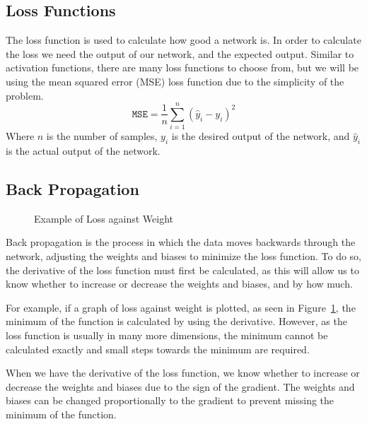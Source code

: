 \documentclass[a1,portrait]{a1poster}
\begin{document}
\begin{multicols}{2}
\subsection*{Loss Functions}
The loss function is used to calculate how good a network is. In order to calculate the loss we need the output of our network, and the expected output. Similar to activation functions, there are many loss functions to choose from, but we will be using the mean squared error (MSE) loss function due to the simplicity of the problem.
\begin{equation}
    \texttt{MSE} = \frac{1}{n}\sum_{i=1}^{n}(\hat{y}_i - y_i)^2
    \label{eq:mse}
\end{equation}
Where $n$ is the number of samples, $y_i$ is the desired output of the network, and $\hat{y}_i$ is the actual output of the network.
\subsection*{Back Propagation}
\begin{figure}
    \centering
    \caption{Example of Loss against Weight}
    \label{fig:loss-weight}
\end{figure}
Back propagation is the process in which the data moves backwards through the network, adjusting the weights and biases to minimize the loss function. To do so, the derivative of the loss function must first be calculated, as this will allow us to know whether to increase or decrease the weights and biases, and by how much.

For example, if a graph of loss against weight is plotted, as seen in Figure~\ref{fig:loss-weight}, the minimum of the function is calculated by using the derivative. However, as the loss function is usually in many more dimensions, the minimum cannot be calculated exactly and small steps towards the minimum are required.

When we have the derivative of the loss function, we know whether to increase or decrease the weights and biases due to the sign of the gradient. The weights and biases can be changed proportionally to the gradient to prevent missing the minimum of the function.


\end{multicols}
\end{document}
